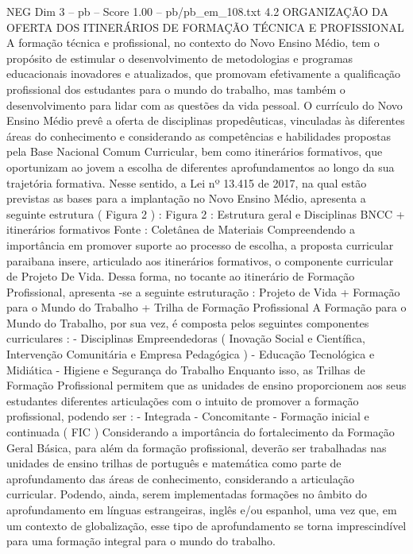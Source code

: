 \begin{textsample}{NEG Dim 3 – pb – Score 1.00 – pb/pb\_em\_108.txt}  \label{ex:f3_neg_204}
4.2 ORGANIZAÇÃO DA OFERTA DOS ITINERÁRIOS DE FORMAÇÃO TÉCNICA E PROFISSIONAL A formação técnica e profissional, no contexto do Novo Ensino Médio, tem o propósito de estimular o desenvolvimento de metodologias e programas educacionais inovadores e atualizados, que promovam efetivamente a qualificação profissional dos estudantes para o mundo do trabalho, mas também o desenvolvimento para lidar com as questões da vida pessoal.
O currículo do Novo Ensino Médio prevê a oferta de disciplinas propedêuticas, vinculadas às diferentes áreas do conhecimento e considerando as competências e habilidades propostas pela Base Nacional Comum Curricular, bem como itinerários formativos, que oportunizam ao jovem a escolha de diferentes aprofundamentos ao longo da sua trajetória formativa.
Nesse sentido, a Lei nº 13.415 de 2017, na qual estão previstas as bases para a implantação no Novo Ensino Médio, apresenta a seguinte estrutura ( Figura 2 ) : Figura 2 : Estrutura geral e Disciplinas BNCC + itinerários formativos Fonte : Coletânea de Materiais Compreendendo a importância em promover suporte ao processo de escolha, a proposta curricular paraibana insere, articulado aos itinerários formativos, o componente curricular de Projeto De Vida.
Dessa forma, no tocante ao itinerário de Formação Profissional, apresenta -se a seguinte estruturação : Projeto de Vida + Formação para o Mundo do Trabalho + Trilha de Formação Profissional A Formação para o Mundo do Trabalho, por sua vez, é composta pelos seguintes componentes curriculares : - Disciplinas Empreendedoras ( Inovação Social e Científica, Intervenção Comunitária e Empresa Pedagógica ) - Educação Tecnológica e Midiática - Higiene e Segurança do Trabalho Enquanto isso, as Trilhas de Formação Profissional permitem que as unidades de ensino proporcionem aos seus estudantes diferentes articulações com o intuito de promover a formação profissional, podendo ser : - Integrada - Concomitante - Formação inicial e continuada ( FIC ) Considerando a importância do fortalecimento da Formação Geral Básica, para além da formação profissional, deverão ser trabalhadas nas unidades de ensino trilhas de português e matemática como parte de aprofundamento das áreas de conhecimento, considerando a articulação curricular.
Podendo, ainda, serem implementadas formações no âmbito do aprofundamento em línguas estrangeiras, inglês e/ou espanhol, uma vez que, em um contexto de globalização, esse tipo de aprofundamento se torna imprescindível para uma formação integral para o mundo do trabalho.

\end{textsample}
